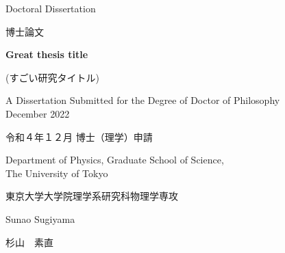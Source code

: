 \thispagestyle{empty}
\begin{center}
    \vspace*{20mm} %
    {\Large
        Doctoral Dissertation\\\vspace{5mm}
        \begin{CJK}{UTF8}{ipxm}博士論文\end{CJK}
    }\vspace{20mm}

    {\Large\bf
        Great thesis title\\\vspace{5mm}
    }
    {\Large
        \begin{CJK}{UTF8}{ipxm}(すごい研究タイトル)\end{CJK}
    }\vspace{50mm}

    {
        A Dissertation Submitted for the Degree of Doctor of Philosophy\\
        December 2022\\\vspace{5mm}
        \begin{CJK}{UTF8}{ipxm}令和４年１２月 博士（理学）申請\end{CJK}
    }\vspace{10mm}

    {
        Department of Physics, Graduate School of Science, \\
        The University of Tokyo\\\vspace{5mm}
        \begin{CJK}{UTF8}{ipxm}東京大学大学院理学系研究科物理学専攻\end{CJK}
    }\vspace{10mm}

    {\Large
        Sunao Sugiyama\\\vspace{5mm}
        \begin{CJK}{UTF8}{ipxm}杉山　素直\end{CJK}
    }
    
\end{center}

\blanckpage
